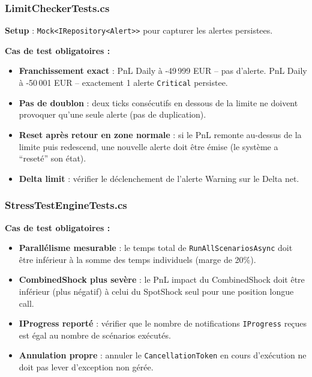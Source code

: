 \documentclass[a4paper,11pt]{article}
\newcommand{\cs}[1]{\texttt{\color{codeinline}#1}}
\begin{document}
\subsubsection{LimitCheckerTests.cs}

\textbf{Setup} : \cs{Mock<IRepository<Alert>>} pour capturer les alertes
persistees.

\textbf{Cas de test obligatoires :}
\begin{itemize}
  \item \textbf{Franchissement exact} : PnL Daily à -49\,999 EUR -- pas
        d'alerte. PnL Daily à -50\,001 EUR -- exactement 1 alerte
        \cs{Critical} persistee.
  \item \textbf{Pas de doublon} : deux ticks consécutifs en dessous de la
        limite ne doivent provoquer qu'une seule alerte (pas de duplication).
  \item \textbf{Reset après retour en zone normale} : si le PnL remonte
        au-dessus de la limite puis redescend, une nouvelle alerte doit être
        émise (le système a ``reseté'' son état).
  \item \textbf{Delta limit} : vérifier le déclenchement de l'alerte
        Warning sur le Delta net.
\end{itemize}

\subsubsection{StressTestEngineTests.cs}

\textbf{Cas de test obligatoires :}
\begin{itemize}
  \item \textbf{Parallélisme mesurable} : le temps total de
        \cs{RunAllScenariosAsync} doit être inférieur à la somme
        des temps individuels (marge de 20\%).
  \item \textbf{CombinedShock plus sevère} : le PnL impact du
        CombinedShock doit être inférieur (plus négatif) à
        celui du SpotShock seul pour une position longue call.
  \item \textbf{IProgress reporté} : vérifier que le nombre de
        notifications \cs{IProgress} reçues est égal au nombre de
        scénarios exécutés.
  \item \textbf{Annulation propre} : annuler le \cs{CancellationToken} en
        cours d'exécution ne doit pas lever d'exception non gérée.
\end{itemize}

\end{document}
